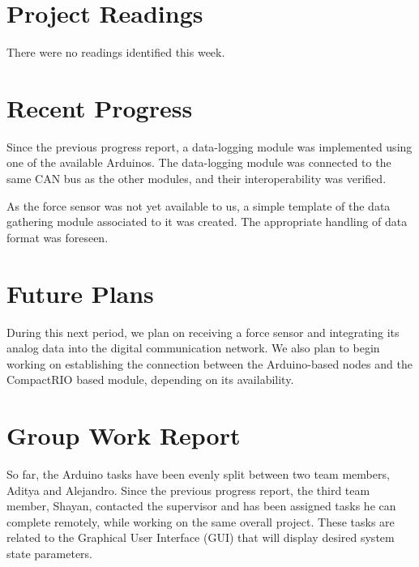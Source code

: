 \documentclass[12pt]{article}
\begin{document}
\section*{Project Readings}
There were no readings identified this week.

\section*{Recent Progress}
Since the previous progress report, a data-logging module was implemented
using one of the available Arduinos. The data-logging module was connected to
the same CAN bus as the other modules, and their interoperability was verified.

As the force sensor was not yet available to us, a simple template of the data
gathering module associated to it was created. The appropriate handling of
data format was foreseen.

\section*{Future Plans}
During this next period, we plan on receiving a force sensor and integrating
its analog data into the digital communication network. We also plan to begin
working on establishing the connection between the Arduino-based nodes and 
the CompactRIO based module, depending on its availability.

\section*{Group Work Report}
So far, the Arduino tasks have been evenly split between two team members, 
Aditya and Alejandro. Since the previous progress report, the third team member,
Shayan, contacted the supervisor and has been assigned tasks he can complete 
remotely, while working on the same overall project. These tasks are related
to the Graphical User Interface (GUI) that will display desired system
state parameters. 
\end{document}
